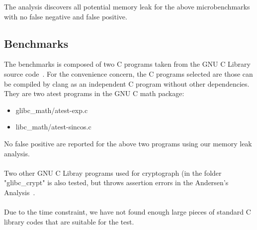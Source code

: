 The analysis discovers all potential memory leak for the above microbenchmarks 
with no false negative and false positive.


\subsection{Benchmarks}
\label{benchmarks}

The benchmarks is composed of two C programs taken from the GNU C Library 
source code~\cite{glibc}. For the convenience concern, the C programs selected 
are those can be compiled by clang as an independent C program without other
dependencies. They are two atest programs in the GNU C math package:

\begin{itemize}
  \item glibc\_math/atest-exp.c
  \item libc\_math/atest-sincos.c
\end{itemize}

No false positive are reported for the above two programs using our memory leak 
analysis. \\ \\

Two other GNU C Libray programs used for cryptograph (in the folder "glibc\_crypt" 
is also tested, but throws assertion errors in the Andersen's 
Analysis~\cite{jia}. \\ \\

Due to the time constraint, we have not found enough large pieces of standard C 
library codes that are suitable for the test.
